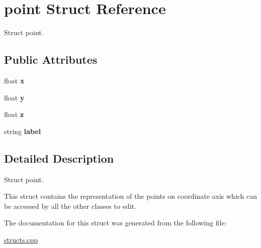 \hypertarget{structpoint}{}\section{point Struct Reference}
\label{structpoint}


Struct point.  


\subsection*{Public Attributes}
\begin{DoxyCompactItemize}
\item 
float {\bfseries x}\hypertarget{structpoint_a8293fd2de3ce739deb6d53691fd21fcf}{}\label{structpoint_a8293fd2de3ce739deb6d53691fd21fcf}

\item 
float {\bfseries y}\hypertarget{structpoint_a616ad85a2096d1566f5971666bbc3b3f}{}\label{structpoint_a616ad85a2096d1566f5971666bbc3b3f}

\item 
float {\bfseries z}\hypertarget{structpoint_a3c15cf62431e51a4d9432ca40b3b04f5}{}\label{structpoint_a3c15cf62431e51a4d9432ca40b3b04f5}

\item 
string {\bfseries label}\hypertarget{structpoint_aac98b52176e98d5ae6ab04ff1351fb14}{}\label{structpoint_aac98b52176e98d5ae6ab04ff1351fb14}

\end{DoxyCompactItemize}


\subsection{Detailed Description}
Struct point. 

This struct contains the representation of the points on coordinate axis which can be accessed by all the other classes to edit. 

The documentation for this struct was generated from the following file\+:\begin{DoxyCompactItemize}
\item 
\hyperlink{structs_8cpp}{structs.\+cpp}\end{DoxyCompactItemize}
